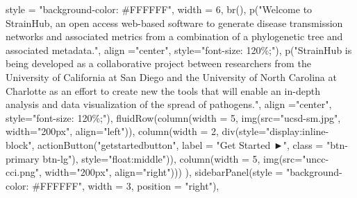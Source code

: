 \documentclass[
]{article}
\newenvironment{Shaded}{\begin{snugshade}}{\end{snugshade}}
\newcommand{\AttributeTok}[1]{\textcolor[rgb]{0.77,0.63,0.00}{#1}}
\newcommand{\DecValTok}[1]{\textcolor[rgb]{0.00,0.00,0.81}{#1}}
\newcommand{\FunctionTok}[1]{\textcolor[rgb]{0.00,0.00,0.00}{#1}}
\newcommand{\NormalTok}[1]{#1}
\newcommand{\StringTok}[1]{\textcolor[rgb]{0.31,0.60,0.02}{#1}}
\begin{document}
\begin{Shaded}
\begin{Highlighting}[]
               \AttributeTok{style =} \StringTok{"background{-}color: \#FFFFFF"}\NormalTok{,}
               \AttributeTok{width =} \DecValTok{6}\NormalTok{,}
               \FunctionTok{br}\NormalTok{(),}
               \FunctionTok{p}\NormalTok{(}\StringTok{"Welcome to StrainHub, an open access web{-}based software to generate disease transmission networks and associated metrics from a combination of a phylogenetic tree and associated metadata."}\NormalTok{,}
                 \AttributeTok{align =}\StringTok{"center"}\NormalTok{,}
                 \AttributeTok{style=}\StringTok{"font{-}size: 120\%;"}\NormalTok{),}
               \FunctionTok{p}\NormalTok{(}\StringTok{"StrainHub is being developed as a collaborative project between researchers from the University of California at San Diego and the University of North Carolina at Charlotte as an effort to create new the tools that will enable an in{-}depth analysis and data visualization of the spread of pathogens."}\NormalTok{,}
                 \AttributeTok{align =}\StringTok{"center"}\NormalTok{,}
                 \AttributeTok{style=}\StringTok{"font{-}size: 120\%;"}\NormalTok{),}
               \FunctionTok{fluidRow}\NormalTok{(}\FunctionTok{column}\NormalTok{(}\AttributeTok{width =} \DecValTok{5}\NormalTok{, }\FunctionTok{img}\NormalTok{(}\AttributeTok{src=}\StringTok{"ucsd{-}sm.jpg"}\NormalTok{, }\AttributeTok{width=}\StringTok{"200px"}\NormalTok{, }\AttributeTok{align=}\StringTok{"left"}\NormalTok{)),}
                        \FunctionTok{column}\NormalTok{(}\AttributeTok{width =} \DecValTok{2}\NormalTok{, }\FunctionTok{div}\NormalTok{(}\AttributeTok{style=}\StringTok{"display:inline{-}block"}\NormalTok{,}
                                              \FunctionTok{actionButton}\NormalTok{(}\StringTok{"getstartedbutton"}\NormalTok{, }\AttributeTok{label =} \StringTok{"Get Started ►"}\NormalTok{, }\AttributeTok{class =} \StringTok{"btn{-}primary btn{-}lg"}\NormalTok{),}
                                              \AttributeTok{style=}\StringTok{"float:middle"}\NormalTok{)),}
                        \FunctionTok{column}\NormalTok{(}\AttributeTok{width =} \DecValTok{5}\NormalTok{, }\FunctionTok{img}\NormalTok{(}\AttributeTok{src=}\StringTok{"uncc{-}cci.png"}\NormalTok{, }\AttributeTok{width=}\StringTok{"200px"}\NormalTok{, }\AttributeTok{align=}\StringTok{"right"}\NormalTok{)))}
\NormalTok{               ),}
             \FunctionTok{sidebarPanel}\NormalTok{(}\AttributeTok{style =} \StringTok{"background{-}color: \#FFFFFF"}\NormalTok{, }\AttributeTok{width =} \DecValTok{3}\NormalTok{, }\AttributeTok{position =} \StringTok{"right"}\NormalTok{),}

\end{Highlighting}
\end{Shaded}
\end{document}

